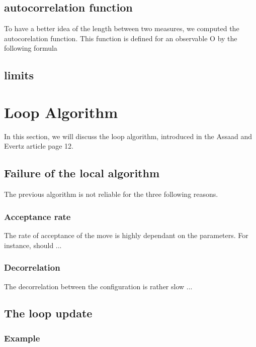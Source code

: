 \documentclass[a4paper,12pt,twoside]{article}
\begin{document}
		 
		 \subsection{autocorrelation function}
		 To have a better idea of the length between two measures, we computed the autocorelation function. This function is defined for an observable O by the following formula
		 



	
	\subsection{limits}


	\section{Loop Algorithm}
	In this section, we will discuss the loop algorithm, introduced in the Assaad and Evertz article page 12. 
	
	\subsection{Failure of the local algorithm}
	The previous algorithm is not reliable for the three following reasons.
	


	\subsubsection{Acceptance rate} The rate of acceptance of the move is highly dependant on the parameters. For instance, should ...
	
	\subsubsection{Decorrelation} The decorrelation between the configuration is rather slow ...

	\subsection{The loop update}
	
	\subsubsection{Example}
	
\end{document}
